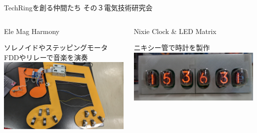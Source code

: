\documentclass[dvipdfmx]{beamer}
\begin{document}
\begin{frame}{TechRingを創る仲間たち その３}{電気技術研究会}
  \begin{columns}[totalwidth=\textwidth]
    \begin{column}{.48\textwidth}
      \begin{footnotesize}
        \begin{alertblock}{\normalsize Ele Mag Harmony}
            \begin{center}
              ソレノイドやステッピングモータ\\
              FDDやリレーで音楽を演奏\\
            \includegraphics[scale=.035]{pic/denken1.jpg}
            \end{center}
        \end{alertblock}
      \end{footnotesize}
    \end{column}
    \begin{column}{.48\textwidth}
      \begin{footnotesize}
        \begin{alertblock}{\normalsize Nixie Clock \& LED Matrix}
          \begin{center}
            ニキシー管で時計を製作\\
            \includegraphics[scale=.06]{pic/denken2.jpg}\\

\end{center}
\end{alertblock}
\end{footnotesize}
\end{column}
\end{columns}
\end{frame}
\end{document}
